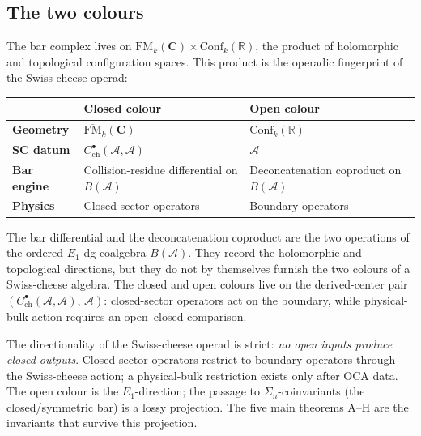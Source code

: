\documentclass[11pt,reqno]{amsart}
\theoremstyle{definition}
\theoremstyle{remark}
\newcommand{\cA}{\mathcal{A}}
\newcommand{\FM}{\overline{\mathrm{FM}}}
\newcommand{\Conf}{\mathrm{Conf}}
\renewcommand{\Bbbk}{\mathbf{C}}
\numberwithin{equation}{section}
\begin{document}
\subsection{The two colours}
\label{ssec:two-colours}

The bar complex lives on $\FM_k(\Bbbk) \times \Conf_k(\mathbb{R})$,
the product of holomorphic and topological configuration spaces.
This product is the operadic fingerprint of the Swiss-cheese
operad:

\begin{center}
\renewcommand{\arraystretch}{1.3}
\begin{tabular}{lll}
\toprule
& \textbf{Closed colour} & \textbf{Open colour} \\
\midrule
\textbf{Geometry} & $\FM_k(\Bbbk)$ & $\Conf_k(\mathbb{R})$ \\
\textbf{SC datum} & $C^\bullet_{\mathrm{ch}}(\cA,\cA)$ &
 $\cA$ \\
\textbf{Bar engine} & Collision-residue differential on $B(\cA)$ &
 Deconcatenation coproduct on $B(\cA)$ \\
\textbf{Physics} & Closed-sector operators & Boundary operators \\
\bottomrule
\end{tabular}
\end{center}

\noindent
The bar differential and the deconcatenation coproduct are the
two operations of the ordered $E_1$ dg coalgebra $B(\cA)$.
They record the holomorphic and topological directions, but
they do not by themselves furnish the two colours of a
Swiss-cheese algebra. The closed and open colours live on the
derived-center pair
$(C^\bullet_{\mathrm{ch}}(\cA,\cA),\,\cA)$:
closed-sector operators act on the boundary, while physical-bulk
action requires an open--closed comparison.

The directionality of the Swiss-cheese operad is strict:
\emph{no open inputs produce closed outputs}. Closed-sector operators
restrict to boundary operators through the Swiss-cheese action; a
physical-bulk restriction exists only after OCA data. The open
colour is the $E_1$-direction; the passage to
$\Sigma_n$-coinvariants (the closed/symmetric bar) is a lossy
projection. The five main theorems A--H are the invariants
that survive this projection.

\end{document}
